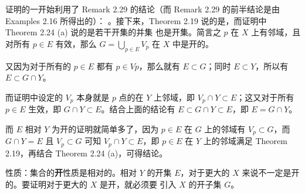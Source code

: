 \documentclass[../poma-notes.tex]{subfiles}
\begin{document}
\begin{anote}
  证明的一开始利用了 Remark 2.29 的结论（而 Remark 2.29 的前半结论是由 Examples 2.16 所得出的）：
  。接下来，Theorem 2.19 说的是，而证明中 Theorem 2.24 (a) 说的是若干开集的并集
  也是开集。简言之 $p$ 在 $X$ 上有邻域，且对所有 $p \in E$ 有效，那么 $G=\bigcup\limits_{p \in E} V_p$ 在 $X$ 中是开的。

  又因为对于所有的 $p \in E$ 都有 $p \in Vp$，那么就有 $E \subset G$；同时 $E \subset Y$，所以有 $E \subset G \cap Y$。

  而证明中设定的 $V_p$ 本身就是 $p$ 点的在 $Y$ 上邻域，即 $V_p \cap Y \subset E$；这又对于所有 $p \in E$ 生效，即
  $G \cap Y \subset E$。结合上面的结论有 $E \subset G \cap Y \subset E$，即 $E = G \cap Y$。

  而 $E$ 相对 $Y$ 为开的证明就简单多了，因为 $p \in E$ 在 $G$ 上的邻域有 $V_p \subset G$，而 $G \cap Y=E$ 且 $V_p \subset G$
  可知 $V_p \cap Y \subset E$，即 $p \in E$ 在 $Y$ 上的邻域满足 Theorem 2.19，再结合 Theorem 2.24 (a)，可得结论。

  性质：集合的\textbf{开}性质是相对的。相对 $Y$ 的开集 $E$，对于更大的 $X$ 来说不一定是开的。要证明对于更大的 $X$ 是开，就必须要
  引入 $X$ 的开子集 $G$。
\end{anote}
\end{document}
